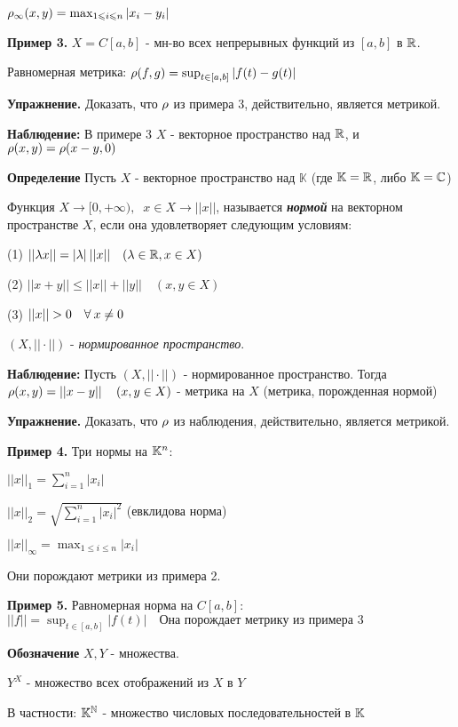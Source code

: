 \documentclass[../../main.tex]{subfiles}
\begin{document}
$\rho_{\infty}(x, y) = \max_{1 \leqslant i \leqslant n}|x_i - y_i|$

\textbf{Пример 3.} $X = C[a, b]$ - мн-во всех непрерывных функций из $[a, b]$ в $\mathbb{R}$.

Равномерная метрика: $\rho(f, g) = \sup_{t \in [a, b]} \left| f(t) - g(t) \right|$

\textbf{Упражнение.} Доказать, что $\rho$ из примера 3, действительно, является метрикой.

\textbf{Наблюдение:} В примере 3 $X$ - векторное пространство над $\mathbb{R}$, и $\rho(x,y) = \rho(x-y, 0)$

\textbf{Определение} Пусть $X$ - векторное пространство над $\mathbb{K}$ (где $\mathbb{K} = \mathbb{R}$, либо $\mathbb{K} = \mathbb{C}$)

Функция $X \longrightarrow [0, +\infty), \;\; x \in X \longrightarrow ||x||$, называется \textbf{\textit{нормой}} на векторном пространстве $X$, если она удовлетворяет следующим условиям:

(1) $|| \lambda x|| = |\lambda| \:||x|| \quad (\lambda \in \mathbb{R}, x \in X)$

(2) $||x + y|| \leq ||x|| + ||y|| \quad (x, y \in X)$

(3) $||x|| > 0 \quad \forall\: x \neq 0$

$\left(X, ||\cdot|| \right)$ - \textit{нормированное пространство}.

\textbf{Наблюдение:} Пусть $\left( X, ||\cdot|| \right)$ - нормированное пространство. Тогда $\rho(x,y) = ||x - y|| \quad \left( x, y \in X \right)$ - метрика на $X$ (метрика, порожденная нормой)

\textbf{Упражнение.} Доказать, что $\rho$ из наблюдения, действительно, является метрикой.

\textbf{Пример 4.} Три нормы на $\mathbb{K}^n$:

$||x||_1 = \sum^n_{i = 1} |x_i|$

$||x||_2 = \sqrt{\sum^n_{i=1}|x_i|^2}$ (евклидова норма)

$||x||_{\infty} = \max_{1 \leq i \leq n} |x_i|$

Они порождают метрики из примера 2.

\textbf{Пример 5.} Равномерная норма на $C[a, b]$: $||f|| = \sup_{t \in [a, b]} |f(t)| \quad \text{Она порождает метрику из примера 3}$

\textbf{Обозначение} $X,Y$ - множества.

$Y^X$ - множество всех отображений из $X$ в $Y$

В частности: $\mathbb{K}^{\mathbb{N}}$ - множество числовых последовательностей в $\mathbb{K}$
\end{document}
